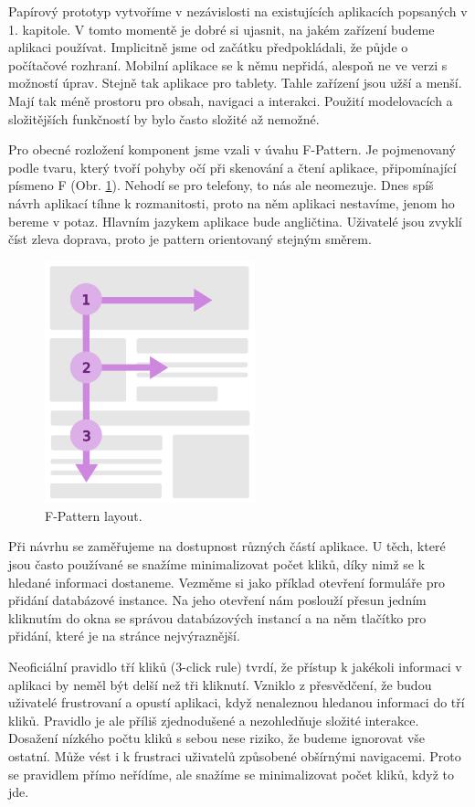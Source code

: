 Papírový prototyp vytvoříme v nezávislosti na existujících aplikacích popsaných v 1. kapitole. V tomto momentě je dobré si ujasnit, na jakém zařízení budeme aplikaci používat. Implicitně jsme od začátku předpokládali, že půjde o počítačové rozhraní. Mobilní aplikace se k němu nepřidá, alespoň ne ve verzi s možností úprav. Stejně tak aplikace pro tablety. Tahle zařízení jsou užší a menší. Mají tak méně prostoru pro obsah, navigaci a interakci. Použití modelovacích a složitějších funkčností by bylo často složité až nemožné.

Pro obecné rozložení komponent jsme vzali v úvahu F-Pattern. Je pojmenovaný podle tvaru, který tvoří pohyby očí při skenování a čtení aplikace, připomínající písmeno F (Obr. \ref{obr05:fpattern}). Nehodí se pro telefony, to nás ale neomezuje. Dnes spíš návrh aplikací tíhne k rozmanitosti, proto na něm aplikaci nestavíme, jenom ho bereme v potaz. Hlavním jazykem aplikace bude angličtina. Uživatelé jsou zvyklí číst zleva doprava, proto je pattern orientovaný stejným směrem.

\begin{figure}[htb]
    \centering
    \includegraphics[height=70mm]{../img/F-Pattern}
    \caption{F-Pattern layout.}
    \label{obr05:fpattern}
  \end{figure}

Při návrhu se zaměřujeme na dostupnost různých částí aplikace. U těch, které jsou často používané se snažíme minimalizovat počet kliků, díky nimž se k hledané informaci dostaneme. Vezměme si jako příklad otevření formuláře pro přidání databázové instance. Na jeho otevření nám poslouží přesun jedním kliknutím do okna se správou databázových instancí a na něm tlačítko pro přidání, které je na stránce nejvýraznější.

Neoficiální pravidlo tří kliků (3-click rule) tvrdí, že přístup k jakékoli informaci v aplikaci by neměl být delší než tři kliknutí. Vzniklo z přesvědčení, že budou uživatelé frustrovaní a opustí aplikaci, když nenaleznou hledanou informaci do tří kliků. Pravidlo je ale příliš zjednodušené a nezohledňuje složité interakce. Dosažení nízkého počtu kliků s sebou nese riziko, že budeme ignorovat vše ostatní. Může vést i k frustraci uživatelů způsobené obšírnými navigacemi. Proto se pravidlem přímo neřídíme, ale snažíme se minimalizovat počet kliků, když to jde.

